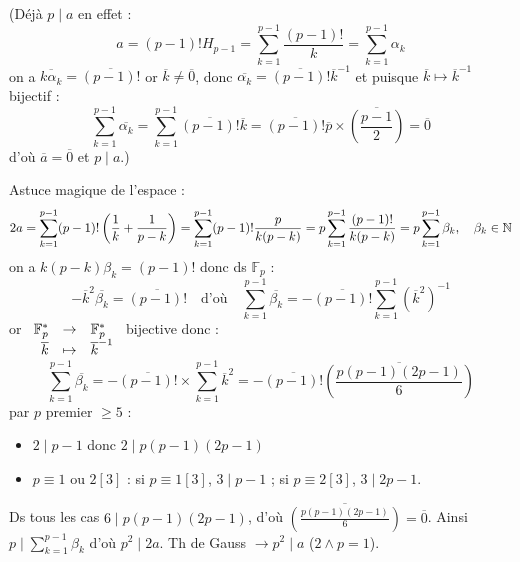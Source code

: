 \begin{solution}
(Déjà $p \mid a$ en effet :
\[ a = (p-1)! H_{p-1} = \sum_{k=1}^{p-1} \frac{(p-1)!}{k} = \sum_{k=1}^{p-1} \alpha_k \]
on a $\overline{k \alpha_k} = \overline{(p-1)!}$ or $\overline{k} \neq \overline{0}$, donc $\overline{\alpha_k} = \overline{(p-1)!} \overline{k}^{-1}$ et puisque $\overline{k} \mapsto \overline{k}^{-1}$ bijectif :
\[ \sum_{k=1}^{p-1} \overline{\alpha_k} = \sum_{k=1}^{p-1} \overline{(p-1)!} \overline{k} = \overline{(p-1)!} \overline{p} \times \overline{\left(\frac{p-1}{2}\right)} = \overline{0} \]
d'où $\overline{a} = \overline{0}$ et $p \mid a$.)

Astuce magique de l'espace :
\[ 2a = \sum_{k=1}^{p-1} (p-1)! \left(\frac{1}{k} + \frac{1}{p-k}\right) = \sum_{k=1}^{p-1} (p-1)! \frac{p}{k(p-k)} = p \sum_{k=1}^{p-1} \frac{(p-1)!}{k(p-k)} = p \sum_{k=1}^{p-1} \beta_k, \quad \beta_k \in \mathbb N \]
on a $k(p-k)\beta_k = (p-1)!$ donc ds $\mathbb{F}_p$ :
\[ -\overline{k}^2 \overline{\beta_k} = \overline{(p-1)!} \quad \text{d'où} \quad \sum_{k=1}^{p-1} \overline{\beta_k} = -\overline{(p-1)!} \sum_{k=1}^{p-1} (\overline{k}^2)^{-1} \]
or $\begin{array}[t]{rcl} \mathbb{F}_p^* & \to & \mathbb{F}_p^* \\ \overline{k} & \mapsto & \overline{k}^{-1} \end{array}$ bijective donc :
\[ \sum_{k=1}^{p-1} \overline{\beta_k} = -\overline{(p-1)!} \times \sum_{k=1}^{p-1} \overline{k}^2 = -\overline{(p-1)!} \overline{\left(\frac{p(p-1)(2p-1)}{6}\right)} \]
par $p$ premier $\geq 5$ :
\begin{itemize}
  \item $2 \mid p-1$ donc $2 \mid p(p-1)(2p-1)$
  \item $p \equiv 1 \text{ ou } 2 [3]$ : si $p \equiv 1 [3]$, $3 \mid p-1$ ; si $p \equiv 2 [3]$, $3 \mid 2p-1$.
\end{itemize}
Ds tous les cas $6 \mid p(p-1)(2p-1)$, d'où $\overline{\left(\frac{p(p-1)(2p-1)}{6}\right)} = \overline{0}$.
Ainsi $p \mid \sum_{k=1}^{p-1} \beta_k$ d'où $p^2 \mid 2a$.
Th de Gauss $\to \boxed{p^2 \mid a}$ ($2 \wedge p = 1$).
\end{solution}


